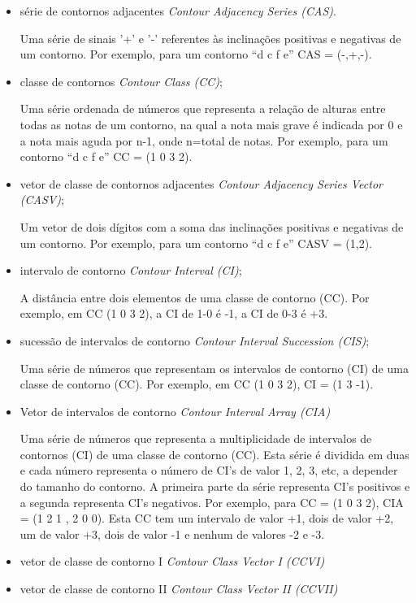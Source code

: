 \documentclass{article}
\newcommand{\eng}[1]{\textit{#1}}
\begin{document}
\begin{itemize}
\item série de contornos adjacentes \eng{Contour Adjacency Series
    (CAS)}.

  Uma série de sinais '+' e '-' referentes às inclinações positivas e
  negativas de um contorno. Por exemplo, para um contorno ``d c f e'' CAS =
  (-,+,-).
\item classe de contornos \eng{Contour Class (CC)};

  Uma série ordenada de números que representa a relação de alturas
  entre todas as notas de um contorno, na qual a nota mais grave é
  indicada por 0 e a nota mais aguda por n-1, onde n=total de
  notas. Por exemplo, para um contorno ``d c f e'' CC = (1 0 3 2).
\item vetor de classe de contornos adjacentes \eng{Contour Adjacency
    Series Vector (CASV)};

  Um  vetor de dois  dígitos com  a soma  das inclinações  positivas e
  negativas de um contorno. Por exemplo, para  um contorno ``d c f e'' CASV =
  (1,2).
\item intervalo de contorno \eng{Contour Interval (CI)};

  A distância entre dois elementos de uma classe de contorno
  (CC). Por exemplo, em CC (1 0 3 2), a CI de 1-0 é -1, a CI de 0-3 é +3.
\item sucessão de intervalos de contorno \eng{Contour Interval
    Succession (CIS)};

  Uma série de números que representam os intervalos de contorno (CI)
  de uma classe de contorno (CC). Por exemplo, em CC (1 0 3 2), CI = (1 3
  -1).

\item Vetor de intervalos de contorno \eng{Contour Interval
    Array (CIA)}

  Uma série de números que representa a multiplicidade de intervalos
  de contornos (CI) de uma classe de contorno (CC). Esta série é
  dividida em duas e cada número representa o número de CI's de valor
  1, 2, 3, etc, a depender do tamanho do contorno. A primeira parte da
  série representa CI's positivos e a segunda representa CI's
  negativos. Por exemplo, para CC = (1 0 3 2), CIA = (1 2 1 , 2 0
  0). Esta CC tem um intervalo de valor +1, dois de valor +2, um de
  valor +3, dois de valor -1 e nenhum de valores -2 e -3.
\item vetor de classe de contorno I \eng{Contour Class Vector I
    (CCVI)}
\item vetor de classe de contorno II \eng{Contour Class Vector II
    (CCVII)}
\end{itemize}



\end{document}
